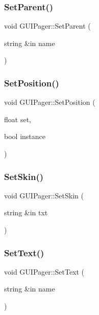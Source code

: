 \subsubsection{\texorpdfstring{Set\+Parent()}{SetParent()}}
{\footnotesize\ttfamily void G\+U\+I\+Pager\+::\+Set\+Parent (\begin{DoxyParamCaption}\item[{string \&in}]{name }\end{DoxyParamCaption})}

\hypertarget{class_g_u_i_pager_af00c176bfa80f8eace1f03998cece1cb}{}\label{class_g_u_i_pager_af00c176bfa80f8eace1f03998cece1cb} 
\subsubsection{\texorpdfstring{Set\+Position()}{SetPosition()}}
{\footnotesize\ttfamily void G\+U\+I\+Pager\+::\+Set\+Position (\begin{DoxyParamCaption}\item[{float}]{set,  }\item[{bool}]{instance }\end{DoxyParamCaption})}

\hypertarget{class_g_u_i_pager_a479a0138f1c453e34f05ba7b3dca428a}{}\label{class_g_u_i_pager_a479a0138f1c453e34f05ba7b3dca428a} 
\subsubsection{\texorpdfstring{Set\+Skin()}{SetSkin()}}
{\footnotesize\ttfamily void G\+U\+I\+Pager\+::\+Set\+Skin (\begin{DoxyParamCaption}\item[{string \&in}]{txt }\end{DoxyParamCaption})}

\hypertarget{class_g_u_i_pager_a6c9df01d049cb8e88f3a7f95d6bf6600}{}\label{class_g_u_i_pager_a6c9df01d049cb8e88f3a7f95d6bf6600} 
\subsubsection{\texorpdfstring{Set\+Text()}{SetText()}}
{\footnotesize\ttfamily void G\+U\+I\+Pager\+::\+Set\+Text (\begin{DoxyParamCaption}\item[{string \&in}]{name }\end{DoxyParamCaption})}


